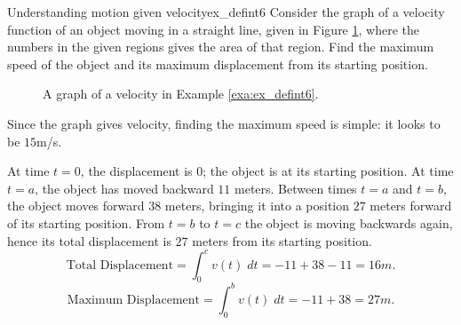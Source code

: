 \begin{example}{Understanding motion given velocity}{ex_defint6}
{
Consider the graph of a velocity function of an object moving in a straight line, given in Figure \ref{fig:defint6}, where the numbers in the given regions gives the area of that region.  Find the maximum speed of the object and its maximum displacement from its starting position.
}
\end{example}
\begin{center}
\begin{figure}
\caption{A graph of a velocity in Example \ref{exa:ex_defint6}.\label{fig:defint6}}
\end{figure}
\end{center}

\begin{solution}
Since the graph gives velocity, finding the maximum speed is simple: it looks to be $ 15 $m/s.

At time $t=0$, the displacement is $ 0 $; the object is at its starting position. At time $t=a$, the object has moved backward $ 11 $ meters. Between times $t=a$ and $t=b$, the object moves forward $ 38 $ meters, bringing it into a position $ 27 $ meters forward of its starting position. From $t=b$ to $t=c$ the object is moving backwards again, hence its total displacement is $ 27 $ meters from its starting position.
\[
\text{Total Displacement} = \int_0^c v(t)\;dt = -11+38-11=16m.
\]
\[
\text{Maximum Displacement} = \int_0^b v(t)\;dt = -11+38=27m.
\]
\end{solution}













